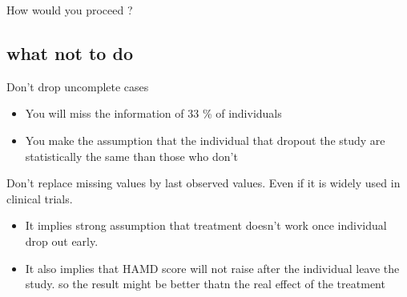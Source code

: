 \documentclass{beamer}
\begin{document}
\begin{frame}
\end{frame}



\begin{frame}
\Large How would you proceed ?	
\end{frame}


\subsection{what not to do}
\begin{frame}
Don't drop uncomplete cases
	\begin{itemize}
        \item You will miss the information of 33 \% of individuals 
        \item You make the assumption that the individual that dropout the study are statistically the same than those who don't
	\end{itemize}
\end{frame}

\begin{frame}
Don't replace missing values by last observed values. Even if it is widely used in clinical trials.
	\begin{itemize}
\item It implies strong assumption that treatment doesn't work once individual drop out early. 
\item It also implies that HAMD score will not raise after the individual leave the study. so the result might be better thatn the real effect of the treatment
	\end{itemize}
\end{frame}
\end{document}
